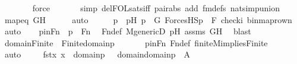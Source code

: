 \begin{isabellebody}
\ \ \ \ \ \ \isamarkupfalse%
\ force\isanewline
\ \ \ \ \ \isamarkupfalse%
\ {\isacharparenleft}{\kern0pt}simp\ del{\isacharcolon}{\kern0pt}FOL{\isacharunderscore}{\kern0pt}sats{\isacharunderscore}{\kern0pt}iff\ pair{\isacharunderscore}{\kern0pt}abs\ add{\isacharcolon}{\kern0pt}\ fm{\isacharunderscore}{\kern0pt}defs\ nat{\isacharunderscore}{\kern0pt}simp{\isacharunderscore}{\kern0pt}union{\isacharparenright}{\kern0pt}\isanewline
\ \ \ \ \isamarkupfalse%
\ mapeq\ GH\isanewline
\ \ \ \ \isamarkupfalse%
\ auto\isanewline
\ \ \isamarkupfalse%
\ \isamarkupfalse%
\ p\ \ pH{\isacharcolon}{\kern0pt}\ {\isachardoublequoteopen}p\ {\isasymin}\ G{\isachardoublequoteclose}\ {\isachardoublequoteopen}ForcesHS{\isacharparenleft}{\kern0pt}p{\isacharcomma}{\kern0pt}\ {\isasymphi}{\isacharcomma}{\kern0pt}\ {\isacharbrackleft}{\kern0pt}F{\isacharprime}{\kern0pt}{\isacharcomma}{\kern0pt}\ check{\isacharparenleft}{\kern0pt}i{\isacharparenright}{\kern0pt}{\isacharcomma}{\kern0pt}\ binmap{\isacharunderscore}{\kern0pt}row{\isacharprime}{\kern0pt}{\isacharparenleft}{\kern0pt}n{\isacharparenright}{\kern0pt}{\isacharbrackright}{\kern0pt}{\isacharparenright}{\kern0pt}{\isachardoublequoteclose}\ \isamarkupfalse%
\ auto\isanewline
\isanewline
\ \ \isamarkupfalse%
\ pinFn\ {\isacharcolon}{\kern0pt}\ {\isachardoublequoteopen}p\ {\isasymin}\ Fn{\isachardoublequoteclose}\ \isamarkupfalse%
\ Fn{\isacharunderscore}{\kern0pt}def\ M{\isacharunderscore}{\kern0pt}genericD\ pH\ assms\ GH\ \isamarkupfalse%
\ blast\ \isanewline
\isanewline
\ \ \isamarkupfalse%
\ domain{\isacharunderscore}{\kern0pt}Finite\ {\isacharcolon}{\kern0pt}\ {\isachardoublequoteopen}Finite{\isacharparenleft}{\kern0pt}domain{\isacharparenleft}{\kern0pt}p{\isacharparenright}{\kern0pt}{\isacharparenright}{\kern0pt}{\isachardoublequoteclose}\ \isanewline
\ \ \ \ \isamarkupfalse%
\ pinFn\ Fn{\isacharunderscore}{\kern0pt}def\ finite{\isacharunderscore}{\kern0pt}M{\isacharunderscore}{\kern0pt}implies{\isacharunderscore}{\kern0pt}Finite\isanewline
\ \ \ \ \isamarkupfalse%
\ auto\isanewline
\isanewline
\ \ \isamarkupfalse%
\ {\isachardoublequoteopen}{\isacharbraceleft}{\kern0pt}\ fst{\isacharparenleft}{\kern0pt}x{\isacharparenright}{\kern0pt}{\isachardot}{\kern0pt}\ x\ {\isasymin}\ domain{\isacharparenleft}{\kern0pt}p{\isacharparenright}{\kern0pt}\ {\isacharbraceright}{\kern0pt}\ {\isacharequal}{\kern0pt}\ domain{\isacharparenleft}{\kern0pt}domain{\isacharparenleft}{\kern0pt}p{\isacharparenright}{\kern0pt}{\isacharparenright}{\kern0pt}{\isachardoublequoteclose}\ {\isacharparenleft}{\kern0pt}\ {\isachardoublequoteopen}{\isacharquery}{\kern0pt}A\ {\isacharequal}{\kern0pt}\ {\isacharunderscore}{\kern0pt}{\isachardoublequoteclose}{\isacharparenright}{\kern0pt}\isanewline

\end{isabellebody}
